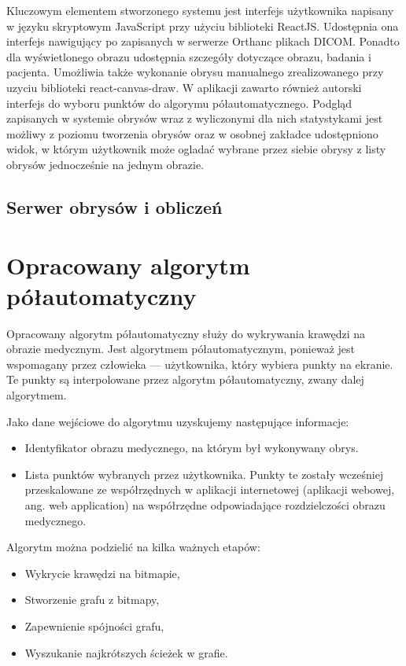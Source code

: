 \documentclass[a4paper,11pt,twoside]{report}
\theoremstyle{definition}
\begin{document}
Kluczowym elementem stworzonego systemu jest interfejs użytkownika napisany w języku skryptowym JavaScript przy użyciu biblioteki ReactJS. Udostępnia ona interfejs nawigujący po zapisanych w serwerze Orthanc plikach DICOM. Ponadto dla wyświetlonego obrazu udostępnia szczegóły dotyczące obrazu, badania i pacjenta. Umożliwia także wykonanie obrysu manualnego zrealizowanego przy uzyciu biblioteki react-canvas-draw. W aplikacji zawarto również autorski interfejs do wyboru punktów do algorymu półautomatycznego. Podgląd zapisanych w systemie obrysów wraz z wyliczonymi dla nich statystykami jest możliwy z poziomu tworzenia obrysów oraz w osobnej zakładce udostępniono widok, w którym użytkownik może ogladać wybrane przez siebie obrysy z listy obrysów jednocześnie na jednym obrazie.

\subsection {Serwer obrysów i obliczeń}



\section {Opracowany algorytm półautomatyczny}

Opracowany algorytm półautomatyczny służy do wykrywania krawędzi na obrazie medycznym. Jest algorytmem półautomatycznym, ponieważ jest wspomagany przez człowieka --- użytkownika, który wybiera punkty na ekranie. Te punkty są interpolowane przez algorytm półautomatyczny, zwany dalej algorytmem.

Jako dane wejściowe do algorytmu uzyskujemy następujące informacje:
\begin{itemize}[noitemsep]
\item {Identyfikator obrazu medycznego, na którym był wykonywany obrys.}
\item {Lista punktów wybranych przez użytkownika. Punkty te zostały wcześniej przeskalowane ze współrzędnych w aplikacji internetowej (aplikacji webowej, ang. web application) na współrzędne odpowiadające rozdzielczości obrazu medycznego.}
\end{itemize}


Algorytm można podzielić na kilka ważnych etapów:

\begin{itemize}[noitemsep]
\item {Wykrycie krawędzi na bitmapie,}
\item {Stworzenie grafu z bitmapy,}
\item {Zapewnienie spójności grafu,}
\item {Wyszukanie najkrótszych ścieżek w grafie.}
\end{itemize}
\end{document}
